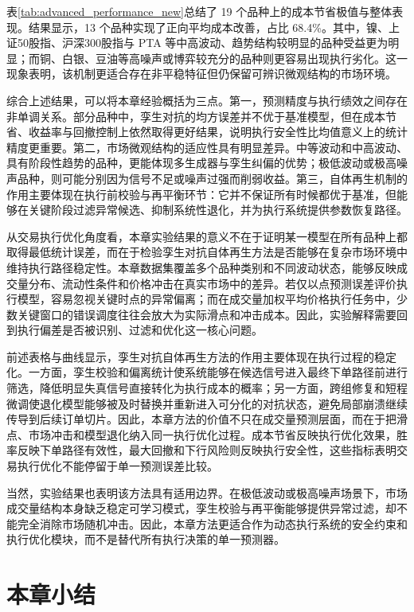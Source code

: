 表\ref{tab:advanced_performance_new}总结了 19 个品种上的成本节省极值与整体表现。结果显示，13 个品种实现了正向平均成本改善，占比 68.4\%。其中，镍、上证50股指、沪深300股指与 PTA 等中高波动、趋势结构较明显的品种受益更为明显；而铜、白银、豆油等高噪声或博弈较充分的品种则更容易出现执行劣化。这一现象表明，该机制更适合存在非平稳特征但仍保留可辨识微观结构的市场环境。

\FloatBarrier

综合上述结果，可以将本章经验概括为三点。第一，预测精度与执行绩效之间存在非单调关系。部分品种中，孪生对抗的均方误差并不优于基准模型，但在成本节省、收益率与回撤控制上依然取得更好结果，说明执行安全性比均值意义上的统计精度更重要。第二，市场微观结构的适应性具有明显差异。中等波动和中高波动、具有阶段性趋势的品种，更能体现多生成器与孪生纠偏的优势；极低波动或极高噪声品种，则可能分别因为信号不足或噪声过强而削弱收益。第三，自体再生机制的作用主要体现在执行前校验与再平衡环节：它并不保证所有时候都优于基准，但能够在关键阶段过滤异常候选、抑制系统性退化，并为执行系统提供参数恢复路径。

从交易执行优化角度看，本章实验结果的意义不在于证明某一模型在所有品种上都取得最低统计误差，而在于检验孪生对抗自体再生方法是否能够在复杂市场环境中维持执行路径稳定性。本章数据集覆盖多个品种类别和不同波动状态，能够反映成交量分布、流动性条件和价格冲击在真实市场中的差异。若仅以点预测误差评价执行模型，容易忽视关键时点的异常偏离；而在成交量加权平均价格执行任务中，少数关键窗口的错误调度往往会放大为实际滑点和冲击成本。因此，实验解释需要回到执行偏差是否被识别、过滤和优化这一核心问题。

前述表格与曲线显示，孪生对抗自体再生方法的作用主要体现在执行过程的稳定化。一方面，孪生校验和偏离统计使系统能够在候选信号进入最终下单路径前进行筛选，降低明显失真信号直接转化为执行成本的概率；另一方面，跨组修复和短程微调使退化模型能够被及时替换并重新进入可分化的对抗状态，避免局部崩溃继续传导到后续订单切片。因此，本章方法的价值不只在成交量预测层面，而在于把滑点、市场冲击和模型退化纳入同一执行优化过程。成本节省反映执行优化效果，胜率反映下单路径有效性，最大回撤和下行风险则反映执行安全性，这些指标表明交易执行优化不能停留于单一预测误差比较。

当然，实验结果也表明该方法具有适用边界。在极低波动或极高噪声场景下，市场成交量结构本身缺乏稳定可学习模式，孪生校验与再平衡能够提供异常过滤，却不能完全消除市场随机冲击。因此，本章方法更适合作为动态执行系统的安全约束和执行优化模块，而不是替代所有执行决策的单一预测器。
\section{本章小结}

